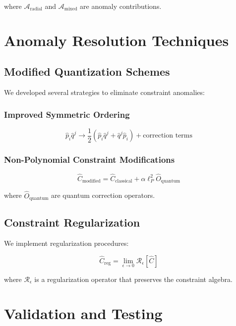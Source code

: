 \documentclass[11pt]{article}
\begin{document}
where $\mathcal{A}_{\text{radial}}$ and $\mathcal{A}_{\text{mixed}}$ are anomaly contributions.

\section{Anomaly Resolution Techniques}

\subsection{Modified Quantization Schemes}

We developed several strategies to eliminate constraint anomalies:

\subsubsection{Improved Symmetric Ordering}
\begin{equation}
\hat{p}_i \hat{q}^j \to \frac{1}{2}(\hat{p}_i \hat{q}^j + \hat{q}^j \hat{p}_i) + \text{correction terms}
\end{equation}

\subsubsection{Non-Polynomial Constraint Modifications}
\begin{equation}
\hat{C}_{\text{modified}} = \hat{C}_{\text{classical}} + \alpha \ell_P^2 \hat{O}_{\text{quantum}}
\end{equation}

where $\hat{O}_{\text{quantum}}$ are quantum correction operators.

\subsection{Constraint Regularization}

We implement regularization procedures:

\begin{equation}
\hat{C}_{\text{reg}} = \lim_{\epsilon \to 0} \mathcal{R}_\epsilon[\hat{C}]
\end{equation}

where $\mathcal{R}_\epsilon$ is a regularization operator that preserves the constraint algebra.

\section{Validation and Testing}
\end{document}
